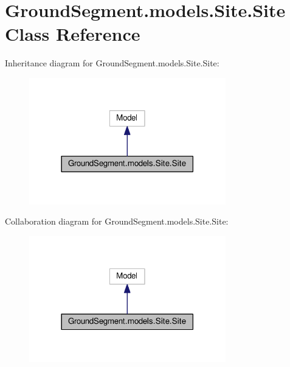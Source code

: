 \hypertarget{class_ground_segment_1_1models_1_1_site_1_1_site}{}\section{Ground\+Segment.\+models.\+Site.\+Site Class Reference}
\label{class_ground_segment_1_1models_1_1_site_1_1_site}


Inheritance diagram for Ground\+Segment.\+models.\+Site.\+Site\+:\nopagebreak
\begin{figure}[H]
\begin{center}
\leavevmode
\includegraphics[width=242pt]{class_ground_segment_1_1models_1_1_site_1_1_site__inherit__graph}
\end{center}
\end{figure}


Collaboration diagram for Ground\+Segment.\+models.\+Site.\+Site\+:\nopagebreak
\begin{figure}[H]
\begin{center}
\leavevmode
\includegraphics[width=242pt]{class_ground_segment_1_1models_1_1_site_1_1_site__coll__graph}
\end{center}
\end{figure}
